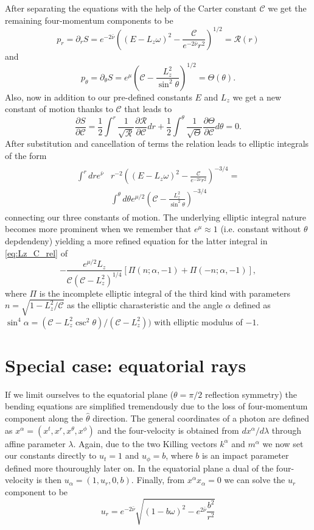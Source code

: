 \documentclass[iop, usenatbib]{emulateapj}
\newcommand{\be}{\begin{equation}}
\newcommand{\ee}{\end{equation}}
\newcommand{\pd}{\ensuremath{\partial}} %
\newcommand{\Ca}{\ensuremath{\mathcal{C}}}
\newcommand{\nub}{\ensuremath{\bar{\nu}}}
\begin{document}
After separating the equations with the help of the Carter constant $\Ca$ we get the remaining four-momentum components to be
\be\label{eq:pr}
p_r = \pd_r S = e^{-2\nub} \left( (E-L_z \omega)^2 - \frac{\mathcal{C}}{e^{-2\nub} r^2} \right)^{1/2} = \mathcal{R}(r)
\ee
and
\be\label{eq:ptheta}
p_{\theta} = \pd_{\theta} S = e^{\mu} \left( \mathcal{C} - \frac{L_z^2}{\sin^2 \theta} \right)^{1/2} = \Theta(\theta).
\ee
Also, now in addition to our pre-defined constants $E$ and $L_z$ we get a new constant of motion thanks to $\mathcal{C}$ that leads to
\be
\frac{\pd S}{\pd \mathcal{C}} = \frac{1}{2} \int^r \frac{1}{\sqrt{\mathcal{R}}} \frac{\pd \mathcal{R}}{\pd \mathcal{C}} dr + \frac{1}{2} \int^{\theta} \frac{1}{\sqrt{\Theta}} \frac{\pd \Theta}{\pd \mathcal{C}} d\theta = 0.
\ee 
After substitution and cancellation of terms the relation leads to elliptic integrals of the form
\begin{align}\begin{split}\label{eq:Lz_C_rel}
 \int^r dr e^{\nub} & r^{-2} \left( (E-L_z\omega)^2 - \frac{\mathcal{C}}{e^{-2\nub} r^2} \right)^{-3/4}  = \\
& \int^{\theta} d\theta e^{\mu/2} \left(\mathcal{C} - \frac{L_z^2}{\sin^2 \theta} \right)^{-3/4}
\end{split}\end{align}
connecting our three constants of motion.
The underlying elliptic integral nature becomes more prominent when we remember that $e^{\mu} \approx 1$ (i.e. constant without $\theta$ depdendeny) yielding a more refined equation for the latter integral in \eqref{eq:Lz_C_rel} of
\be
-\frac{e^{\mu/2} L_z}{\mathcal{C} (\mathcal{C}-L_z^2)^{1/4}} [ \Pi(n; \alpha, -1)+\Pi(-n;\alpha, -1)],
\ee
where $\Pi$ is the incomplete elliptic integral of the third kind with parameters $n = \sqrt{1-L_z^2/\mathcal{C}}$ as the elliptic charasteristic and the angle $\alpha$ defined as $\sin^4 \alpha = (\mathcal{C}-L_z^2 \csc^2 \theta)/(\mathcal{C}-L_z^2))$ with elliptic modulus of $-1$.


\section{Special case: equatorial rays}
If we limit ourselves to the equatorial plane ($\theta=\pi/2$ reflection symmetry) the bending equations are simplified tremendously due to the loss of four-momentum component along the $\hat{\theta}$ direction.
The general coordinates of a photon are defined as $x^{\alpha} = (x^{t}, x^{r}, x^{\theta}, x^{\phi})$ and the four-velocity is obtained from $dx^{\alpha}/d\lambda$ through affine parameter $\lambda$.
Again, due to the two Killing vectors $k^{\alpha}$ and $m^{\alpha}$ we now set our constants directly to $u_{t} = 1$ and $u_{\phi} = b$, where $b$ is an impact parameter defined more thouroughly later on.
In the equatorial plane a dual of the four-velocity is then $u_{\alpha} = (1, u_{r}, 0, b)$.
Finally, from $x^{\alpha}x_{\alpha} = 0$ we can solve the $u_{r}$ component to be
\be
u_{r} = e^{-2\nub}\sqrt{(1-b\omega)^2 - e^{2\nub}\frac{b^2}{r^2}} 
\ee
\end{document}
